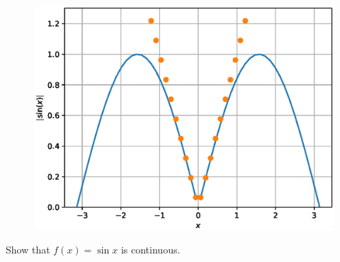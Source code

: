 \documentclass[journal,12pt,twocolumn]{IEEEtran}
\begin{document}
\begin{figure}[!ht]
\begin{center}
\includegraphics[width=\columnwidth]{./figs/2.eps}
\end{center}
\label{fig:2}	
\end{figure}
%
\begin{problem}
Show that $f(x) = \sin{x}$  is continuous.
\end{problem}
\end{document}
